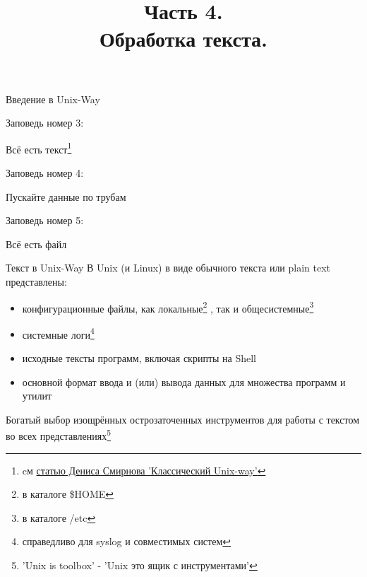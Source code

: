 


\title[SaM Solutions. Linux QA Training]
{
  Часть 4.\\
  Обработка текста.
}


\begin{frame}
  \titlepage
\end{frame}

\begin{frame}{Введение в Unix-Way}
  
  Заповедь номер 3:\newline 
  \begin{center}
    \alert{\Huge{Всё есть текст}}\footnote{cм \href{http://www.freesource.info/wiki/Stat'ja\_Klassicheskijj\_Unix\_Way}{статью Дениса Смирнова 'Классический Unix-way'} }\newline
  \end{center} \pause
  
  Заповедь номер 4:\newline
  \begin{center}
    \alert{\Huge{Пускайте данные по трубам}}\newline
  \end{center} \pause

  Заповедь номер 5:\newline
  \begin{center}
    \alert{\Huge{Всё есть файл}}\newline
  \end{center}

\end{frame}

\begin{frame}{Текст в Unix-Way}
  В Unix (и Linux) в виде обычного текста или \alert{plain text} представлены:\pause
  \begin{itemize}
    \item \alert{конфигурационные файлы}, как локальные\footnote{в каталоге \$HOME} , так и общесистемные\footnote{в каталоге /etc} \pause
    \item \alert{системные логи}\footnote{справедливо для \alert{syslog} и совместимых систем}
    \item \alert{исходные тексты программ}, включая скрипты на Shell
    \item \alert{основной формат ввода и (или) вывода данных} для множества программ и утилит
  \end{itemize} \pause

  Богатый выбор изощрённых острозаточенных инструментов для работы с текстом во всех представлениях\footnote{'Unix is toolbox' - 'Unix это ящик с инструментами'}

\end{frame}

